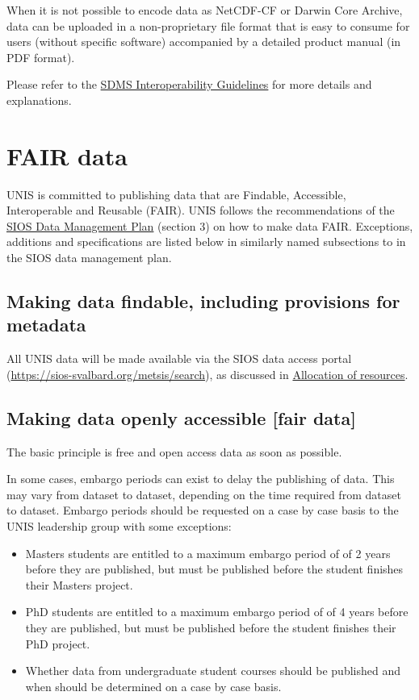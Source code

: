 \documentclass[a4paper,english, 11pt]{article}
\begin{document}
When it is not possible to encode data as NetCDF-CF or Darwin Core Archive, data can be uploaded in a non-proprietary file format that is easy to consume for users (without specific software) accompanied by a detailed product manual (in PDF format).

Please refer to the \href{https://sios-svalbard.org/sites/sios-svalbard.org/files/common/SDMS_Interoperability_Guidelines.pdf}{SDMS Interoperability Guidelines} for more details and explanations.

\section{FAIR data}
\label{s:fair}

UNIS is committed to publishing data that are Findable, Accessible, Interoperable and Reusable (FAIR). UNIS follows the recommendations of the \href{https://sios-svalbard.org/sites/sios-svalbard.org/files/common/SIOS_Data_Management_Plan.pdf}{SIOS Data Management Plan} (section 3) on how to make data FAIR. Exceptions, additions and specifications are listed below in similarly named subsections to in the SIOS data management plan.

\subsection{Making data findable, including provisions for metadata}
\label{ss:findable}

All UNIS data will be made available via the SIOS data access portal (\url{https://sios-svalbard.org/metsis/search}), as discussed in \href{s:resources}{Allocation of resources}. 

\subsection{Making data openly accessible [fair data]}
\label{ss:accessible}

The basic principle is free and open access data as soon as possible. 

In some cases, embargo periods can exist to delay the publishing of data. This may vary from dataset to dataset, depending on the time required from dataset to dataset. Embargo periods should be requested on a case by case basis to the UNIS leadership group with some exceptions:

 \begin{itemize}
 \item Masters students are entitled to a maximum embargo period of of 2 years before they are published, but must be published before the student finishes their Masters project. 
 \item PhD students are entitled to a maximum embargo period of of 4 years before they are published, but must be published before the student finishes their PhD project.
 \item Whether data from undergraduate student courses should be published and when should be determined on a case by case basis. 
 \end{itemize}
\end{document}
